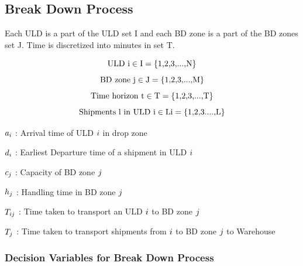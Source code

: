 \documentclass[11pt,a4paper,fleqn]{article}
\begin{document}
\subsection{Break Down Process}
\label{sec:ParamBDZone}

Each ULD is a part of the ULD set I and each BD zone is a part of the BD zones set J. Time is discretized into minutes in set T.

\begin{equation*} ${\color{black} ULD i}$ {}  \in {}  ${\color{black}I}$ {} = {} ${\color{black}\{1,2,3,...,N\}}$  \end{equation*} 
\begin{equation*} ${\color{black} BD zone j}$ {}  \in {}  ${\color{black}J}$ {} = {} ${\color{black}\{1,2,3,...,M\}}$ \end{equation*} 
\begin{equation*} ${\color{black} Time horizon t}$ {}  \in {}  ${\color{black}T}$ {} = {} ${\color{black}\{1,2,3,...,T\}}$ \end{equation*}
\begin{equation*} ${\color{black} Shipments l in ULD i}$ {}  \in {}  ${\color{black}Li}$ {} = {} ${\color{black}\{1,2,3....,L\}}$ \end{equation*} %


${\color{black}a_{i}}$ : Arrival time of ULD ${\color{black}i}$ in drop zone 

${\color{black}d_{i}}$ : Earliest Departure time of a shipment in ULD ${\color{black}i}$ 



${\color{black}c_{j}}$ : Capacity of BD zone ${\color{black}j}$

$\textcolor{black}{h_{j}}$ : Handling time in BD zone ${\color{black}j}$

$\textcolor{black}{T_{ij}}$ : Time taken to transport an ULD ${\color{black}i}$ to BD zone ${\color{black}j}$

$\textcolor{black}{T_{j}}$ : Time taken to transport shipments from ${\color{black}i}$ to BD zone ${\color{black}j}$ to Warehouse


\subsubsection{Decision Variables for Break Down Process}
\label{sec:DVBDZone}
\end{document}
